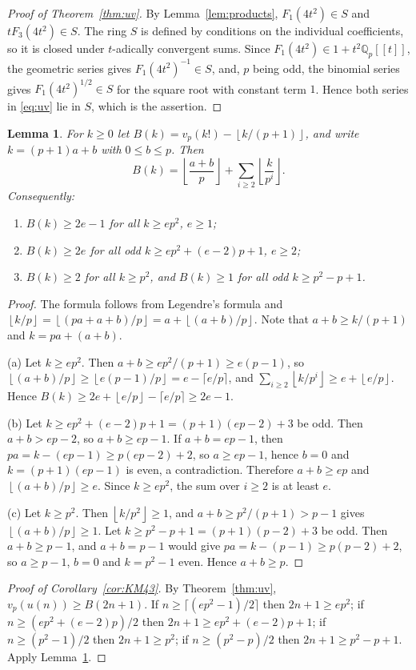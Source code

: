 \documentclass[11pt]{amsart}
\newtheorem{lemma}[theorem]{Lemma}
\theoremstyle{definition}
\theoremstyle{remark}
\newcommand{\Q}{\mathbb{Q}}
\newcommand{\fl}[1]{\left\lfloor #1 \right\rfloor}
\begin{document}
\begin{proof}[Proof of Theorem~\ref{thm:uv}]
By Lemma~\ref{lem:products}, $F_1(4t^2)\in S$ and $tF_3(4t^2)\in S$. The ring $S$ is defined by
conditions on the individual coefficients, so it is closed under $t$-adically convergent sums.
Since $F_1(4t^2)\in1+t^2\Q_p[[t]]$, the geometric series gives $F_1(4t^2)^{-1}\in S$, and, $p$
being odd, the binomial series gives $F_1(4t^2)^{1/2}\in S$ for the square root with constant
term $1$. Hence both series in \eqref{eq:uv} lie in $S$,
which is the assertion.
\end{proof}

\begin{lemma}\label{lem:B}
For $k\ge0$ let $B(k)=v_p(k!)-\fl{k/(p+1)}$, and write $k=(p+1)a+b$ with $0\le b\le p$. Then
\[
B(k)=\fl{\frac{a+b}{p}}+\sum_{i\ge2}\fl{\frac{k}{p^i}} .
\]
Consequently:
\begin{enumerate}
\item[(a)] $B(k)\ge2e-1$ for all $k\ge ep^2$, $e\ge1$;
\item[(b)] $B(k)\ge2e$ for all odd $k\ge ep^2+(e-2)p+1$, $e\ge2$;
\item[(c)] $B(k)\ge2$ for all $k\ge p^2$, and $B(k)\ge1$ for all odd $k\ge p^2-p+1$.
\end{enumerate}
\end{lemma}

\begin{proof}
The formula follows from Legendre's formula and $\fl{k/p}=\fl{(pa+a+b)/p}=a+\fl{(a+b)/p}$. Note
that $a+b\ge k/(p+1)$ and $k=pa+(a+b)$.

(a) Let $k\ge ep^2$. Then $a+b\ge ep^2/(p+1)\ge e(p-1)$, so
$\fl{(a+b)/p}\ge\fl{e(p-1)/p}=e-\lceil e/p\rceil$, and
$\sum_{i\ge2}\fl{k/p^i}\ge e+\fl{e/p}$. Hence $B(k)\ge2e+\fl{e/p}-\lceil e/p\rceil\ge2e-1$.

(b) Let $k\ge ep^2+(e-2)p+1=(p+1)(ep-2)+3$ be odd. Then $a+b>ep-2$, so $a+b\ge ep-1$. If
$a+b=ep-1$, then $pa=k-(ep-1)\ge p(ep-2)+2$, so $a\ge ep-1$, hence $b=0$ and $k=(p+1)(ep-1)$ is
even, a contradiction. Therefore $a+b\ge ep$ and $\fl{(a+b)/p}\ge e$. Since $k\ge ep^2$, the sum
over $i\ge2$ is at least $e$.

(c) Let $k\ge p^2$. Then $\fl{k/p^2}\ge1$, and $a+b\ge p^2/(p+1)>p-1$ gives $\fl{(a+b)/p}\ge1$. Let
$k\ge p^2-p+1=(p+1)(p-2)+3$ be odd. Then $a+b\ge p-1$, and $a+b=p-1$ would give
$pa=k-(p-1)\ge p(p-2)+2$, so $a\ge p-1$, $b=0$ and $k=p^2-1$ even. Hence $a+b\ge p$.
\end{proof}

\begin{proof}[Proof of Corollary~\ref{cor:KM43}]
By Theorem~\ref{thm:uv}, $v_p(u(n))\ge B(2n+1)$. If $n\ge\lceil(ep^2-1)/2\rceil$ then
$2n+1\ge ep^2$; if $n\ge(ep^2+(e-2)p)/2$ then $2n+1\ge ep^2+(e-2)p+1$; if $n\ge(p^2-1)/2$ then
$2n+1\ge p^2$; if $n\ge(p^2-p)/2$ then $2n+1\ge p^2-p+1$. Apply Lemma~\ref{lem:B}.
\end{proof}
\end{document}
